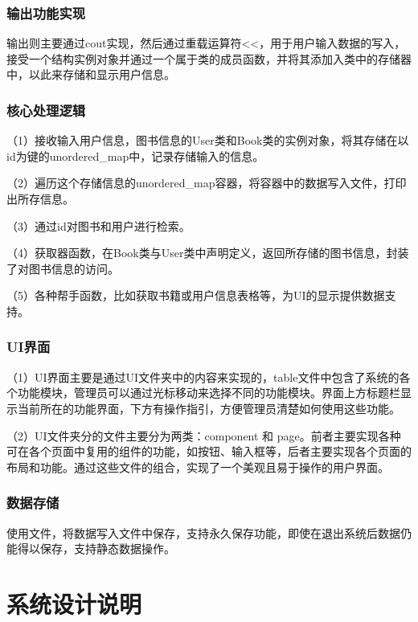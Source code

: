 \documentclass{article}
\begin{document}
\subsubsection{输出功能实现}
输出则主要通过cout实现，然后通过重载运算符<<，用于用户输入数据的写入，接受一个结构实例对象并通过一个属于类的成员函数，并将其添加入类中的存储器中，以此来存储和显示用户信息。\\
\subsubsection{核心处理逻辑}
（1）接收输入用户信息，图书信息的User类和Book类的实例对象，将其存储在以id为键的unordered\_map中，记录存储输入的信息。

（2）遍历这个存储信息的unordered\_map容器，将容器中的数据写入文件，打印出所存信息。

（3）通过id对图书和用户进行检索。

（4）获取器函数，在Book类与User类中声明定义，返回所存储的图书信息，封装了对图书信息的访问。

（5）各种帮手函数，比如获取书籍或用户信息表格等，为UI的显示提供数据支持。
\subsubsection{UI界面}

（1）UI界面主要是通过UI文件夹中的内容来实现的，table文件中包含了系统的各个功能模块，管理员可以通过光标移动来选择不同的功能模块。界面上方标题栏显示当前所在的功能界面，下方有操作指引，方便管理员清楚如何使用这些功能。

（2）UI文件夹分的文件主要分为两类：component 和 page。前者主要实现各种可在各个页面中复用的组件的功能，如按钮、输入框等，后者主要实现各个页面的布局和功能。通过这些文件的组合，实现了一个美观且易于操作的用户界面。
\subsubsection{数据存储}

使用文件，将数据写入文件中保存，支持永久保存功能，即使在退出系统后数据仍能得以保存，支持静态数据操作。\\
\section{系统设计说明}
\end{document}
